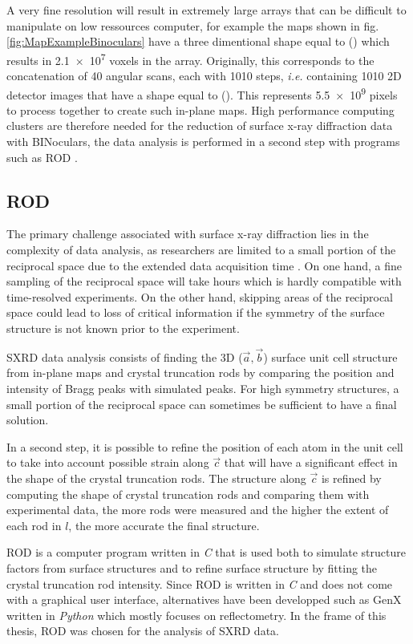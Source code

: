 A very fine resolution will result in extremely large arrays that can be difficult to manipulate on low ressources computer, for example the maps shown in fig. \ref{fig:MapExampleBinoculars} have a three dimentional shape equal to () which results in \num{2.1e7} voxels in the array.
Originally, this corresponds to the concatenation of 40 angular scans, each with 1010 steps, \textit{i.e.} containing 1010 2D detector images that have a shape equal to ().
This represents \num{5.5e9} pixels to process together to create such in-plane maps.
High performance computing clusters are therefore needed for the reduction of surface x-ray diffraction data with BINoculars, the data analysis is performed in a second step with programs such as ROD \parencite{Vlieg2000}.

\subsection{ROD} \label{sec:ROD}

The primary challenge associated with surface x-ray diffraction lies in the complexity of data analysis, as researchers are limited to a small portion of the reciprocal space due to the extended data acquisition time \parencite{Gustafson2014}.
On one hand, a fine sampling of the reciprocal space will take hours which is hardly compatible with time-resolved experiments.
On the other hand, skipping areas of the reciprocal space could lead to loss of critical information if the symmetry of the surface structure is not known prior to the experiment.

SXRD data analysis consists of finding the 3D ($\vec{a}, \vec{b}$) surface unit cell structure from in-plane maps and crystal truncation rods by comparing the position and intensity of Bragg peaks with simulated peaks.
For high symmetry structures, a small portion of the reciprocal space can sometimes be sufficient to have a final solution.

In a second step, it is possible to refine the position of each atom in the unit cell to take into account possible strain along $\vec{c}$ that will have a significant effect in the shape of the crystal truncation rods.
The structure along $\vec{c}$ is refined by computing the shape of crystal truncation rods and comparing them with experimental data, the more rods were measured and the higher the extent of each rod in $l$, the more accurate the final structure.

ROD is a computer program written in \textit{C} \parencite{Vlieg2000} that is used both to simulate structure factors from surface structures and to refine surface structure by fitting the crystal truncation rod intensity.
Since ROD is written in \textit{C} and does not come with a graphical user interface, alternatives have been developped such as GenX \parencite{Bjorck2007,Glavic2022} written in \textit{Python} which mostly focuses on reflectometry.
In the frame of this thesis, ROD was chosen for the analysis of SXRD data.
